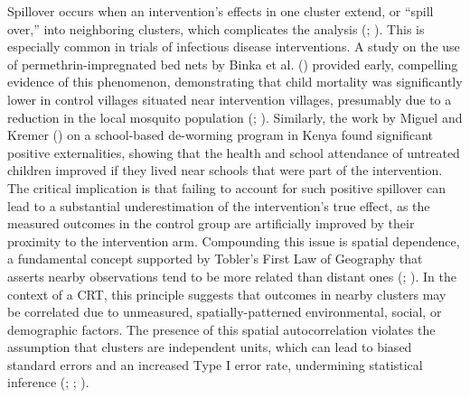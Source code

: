 \documentclass[
  12pt,
  prelim]{bios-prelim}
\begin{document}
Spillover occurs when an intervention's effects in one cluster extend,
or ``spill over,'' into neighboring clusters, which complicates the
analysis (; ). This is especially common in trials of infectious disease
interventions. A study on the use of permethrin-impregnated bed nets by
Binka et al. () provided early,
compelling evidence of this phenomenon, demonstrating that child
mortality was significantly lower in control villages situated near
intervention villages, presumably due to a reduction in the local
mosquito population (; ).
Similarly, the work by Miguel and Kremer
() on a school-based de-worming
program in Kenya found significant positive externalities, showing that
the health and school attendance of untreated children improved if they
lived near schools that were part of the intervention. The critical
implication is that failing to account for such positive spillover can
lead to a substantial underestimation of the intervention's true effect,
as the measured outcomes in the control group are artificially improved
by their proximity to the intervention arm. Compounding this issue is
spatial dependence, a fundamental concept supported by Tobler's First
Law of Geography that asserts nearby observations tend to be more
related than distant ones (; ). In the
context of a CRT, this principle suggests that outcomes in nearby
clusters may be correlated due to unmeasured, spatially-patterned
environmental, social, or demographic factors. The presence of this
spatial autocorrelation violates the assumption that clusters are
independent units, which can lead to biased standard errors and an
increased Type I error rate, undermining statistical inference
(;
;
).
\end{document}
